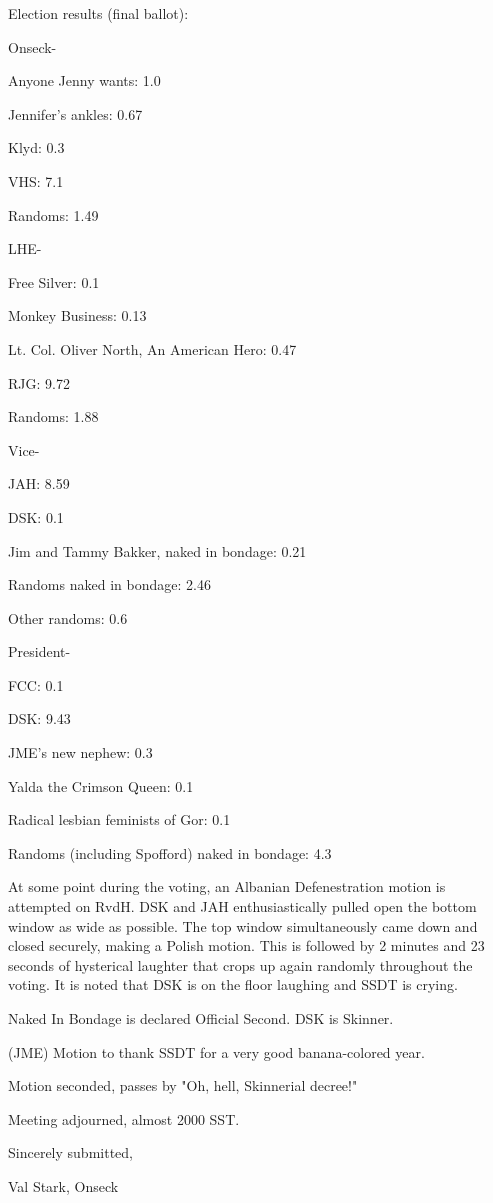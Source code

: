 \documentclass[12pt]{article}
\begin{document}
Election results (final ballot):

Onseck-

Anyone Jenny wants: 1.0

Jennifer's ankles: 0.67

Klyd: 0.3

VHS: 7.1

Randoms: 1.49

LHE-

Free Silver: 0.1

Monkey Business: 0.13

Lt. Col. Oliver North, An American Hero: 0.47

RJG: 9.72

Randoms: 1.88

Vice-

JAH: 8.59

DSK: 0.1

Jim and Tammy Bakker, naked in bondage: 0.21

Randoms naked in bondage: 2.46

Other randoms: 0.6

President-

FCC: 0.1

DSK: 9.43

JME's new nephew: 0.3

Yalda the Crimson Queen: 0.1

Radical lesbian feminists of Gor: 0.1

Randoms (including Spofford) naked in bondage: 4.3

At some point during the voting, an Albanian Defenestration motion is attempted on RvdH. DSK and JAH enthusiastically pulled open the bottom window as wide as possible. The top window simultaneously came down and closed securely, making a Polish motion. This is followed by 2 minutes and 23 seconds of hysterical laughter that crops up again randomly throughout the voting. It is noted that DSK is on the floor laughing and SSDT is crying.

Naked In Bondage is declared Official Second. DSK is Skinner.

(JME) Motion to thank SSDT for a very good banana-colored year.

Motion seconded, passes by "Oh, hell, Skinnerial decree!"

\vspace{12pt}

\noindent
Meeting adjourned, almost 2000 SST.

\vspace{18pt}

\centerline{Sincerely submitted,}
\centerline{Val Stark, Onseck}
\end{document}
